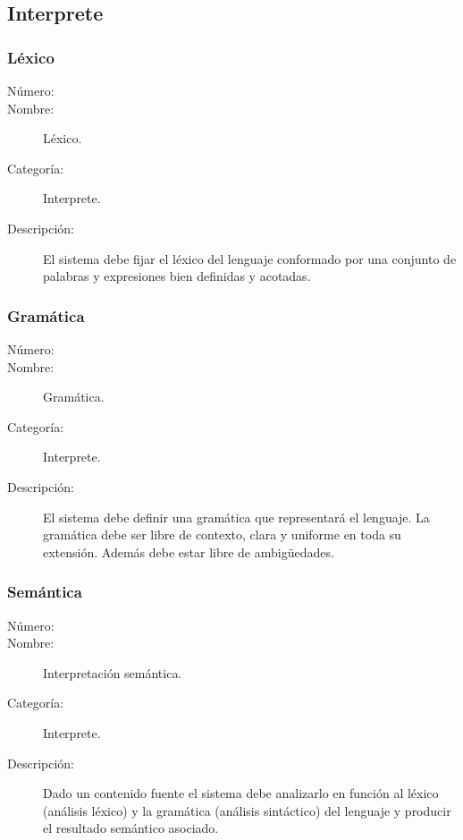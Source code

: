 


\subsection{Interprete}

\subsubsection{Léxico}
\begin{framed}
	\begin{description}
		\item [Número:] \cn
		\item [Nombre:] Léxico.
		\item [Categoría:] Interprete.
		\item [Descripción:] El sistema debe fijar el léxico del lenguaje conformado por una conjunto de palabras y expresiones bien definidas y acotadas.
	\end{description}
\end{framed}

\subsubsection{Gramática}
\begin{framed}
	\begin{description}
		\item [Número:] \cn
		\item [Nombre:] Gramática.
		\item [Categoría:] Interprete.
		\item [Descripción:] El sistema debe definir una gramática que representará el lenguaje. La gramática debe ser libre de contexto, clara
		y uniforme en toda su extensión. Además debe estar libre de ambigüedades.
	\end{description}
\end{framed}

\subsubsection{Semántica}
\begin{framed}
	\begin{description}
		\item [Número:] \cn
		\item [Nombre:] Interpretación semántica.
		\item [Categoría:] Interprete.
		\item [Descripción:] Dado un contenido fuente el sistema debe analizarlo en función al léxico (análisis léxico) y la gramática (análisis sintáctico)
		del lenguaje y producir el resultado semántico asociado.
	\end {description}
\end{framed}

